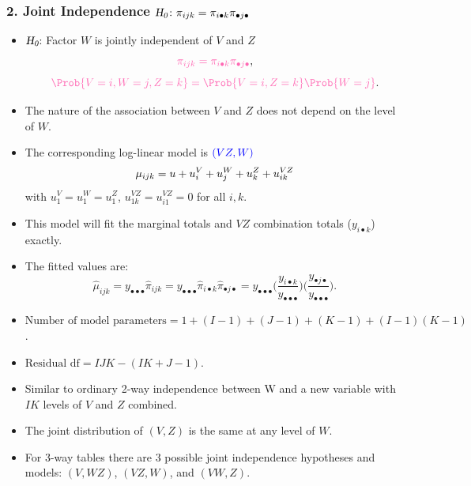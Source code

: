 \documentclass[oneside]{book}\usepackage[]{graphicx}\usepackage[svgnames]{xcolor}
\let\log\relax%
\newcommand{\HN}{\textsl{H}_{\textsl{0}}}%
\begin{document}
\subsubsection*{2. Joint Independence $ \HN\colon \pi_{ijk}=\pi_{i\bullet k}\pi_{\bullet j\bullet} $}
\begin{itemize}
      \item $ \HN $: Factor $ W $ is jointly independent of $ V $ and $ Z $
            \[ \textcolor{HotPink}{\pi_{ijk}=\pi_{i\bullet k}\pi_{\bullet j\bullet}}, \]
            \[ \textcolor{HotPink}{\Prob{V=i,W=j,Z=k}=\Prob{V=i,Z=k}\Prob{W=j}}. \]
      \item The nature of the association between $ V $ and $ Z $ does not depend on the level of $ W $.
      \item The corresponding log-linear model is $ \textcolor{Blue}{(VZ,W)} $
            \[ \log{\mu_{ijk}}=u+u_i^V+u_j^W+u_k^Z+u_{ik}^{VZ} \]
            with $ u_1^V=u_1^W=u_1^Z $, $ u_{1k}^{VZ}=u_{i1}^{VZ}=0 $ for all $ i,k $.
      \item This model will fit the marginal totals and $ VZ $ combination totals ($ y_{i\bullet k} $) exactly.
      \item The fitted values are:
            \[ \hat{\mu}_{ijk}=y_{\bullet\bullet\bullet}\hat{\pi}_{ijk}=y_{\bullet\bullet\bullet}\hat{\pi}_{i\bullet k}\hat{\pi}_{\bullet j\bullet}=y_{\bullet\bullet\bullet}\biggl(\frac{y_{i\bullet k}}{y_{\bullet\bullet\bullet}}\biggr)\biggl(\frac{y_{\bullet j\bullet}}{y_{\bullet\bullet\bullet}}\biggr). \]
      \item $ \text{Number of model parameters}=1 + (I - 1) + (J - 1) + (K - 1) + (I - 1)(K - 1) $.
      \item $ \text{Residual df}=IJK-(IK+J-1) $.
      \item Similar to ordinary 2-way independence between W and a new variable with $IK$
            levels of $V$ and $Z$ combined.
      \item The joint distribution of $(V,Z)$ is the same at any level of $W$.
      \item For 3-way tables there are 3 possible joint independence hypotheses and models:
            $(V,WZ)$, $(VZ,W)$, and $(VW,Z)$.
\end{itemize}
\end{document}
